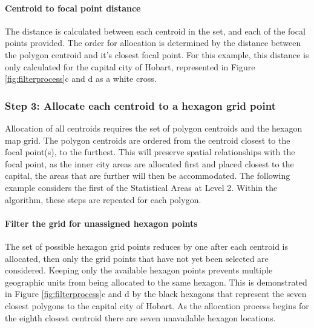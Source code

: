 \hypertarget{centroid-to-focal-point-distance}{%
\paragraph{Centroid to focal point
distance}\label{centroid-to-focal-point-distance}}

The distance is calculated between each centroid in the set, and each of
the focal points provided. The order for allocation is determined by the
distance between the polygon centroid and it's closest focal point. For
this example, this distance is only calculated for the capital city of
Hobart, represented in Figure \ref{fig:filterprocess}c and d as a white
cross.

\hypertarget{step-3-allocate-each-centroid-to-a-hexagon-grid-point}{%
\subsubsection{Step 3: Allocate each centroid to a hexagon grid
point}\label{step-3-allocate-each-centroid-to-a-hexagon-grid-point}}

Allocation of all centroids requires the set of polygon centroids and
the hexagon map grid. The polygon centroids are ordered from the
centroid closest to the focal point(s), to the furthest. This will
preserve spatial relationships with the focal point, as the inner city
areas are allocated first and placed closest to the capital, the areas
that are further will then be accommodated. The following example
considers the first of the Statistical Areas at Level 2. Within the
algorithm, these steps are repeated for each polygon.

\hypertarget{filter-the-grid-for-unassigned-hexagon-points}{%
\paragraph{Filter the grid for unassigned hexagon
points}\label{filter-the-grid-for-unassigned-hexagon-points}}

The set of possible hexagon grid points reduces by one after each
centroid is allocated, then only the grid points that have not yet been
selected are considered. Keeping only the available hexagon points
prevents multiple geographic units from being allocated to the same
hexagon. This is demonstrated in Figure \ref{fig:filterprocess}c and d
by the black hexagons that represent the seven closest polygons to the
capital city of Hobart. As the allocation process begins for the eighth
closest centroid there are seven unavailable hexagon locations.

